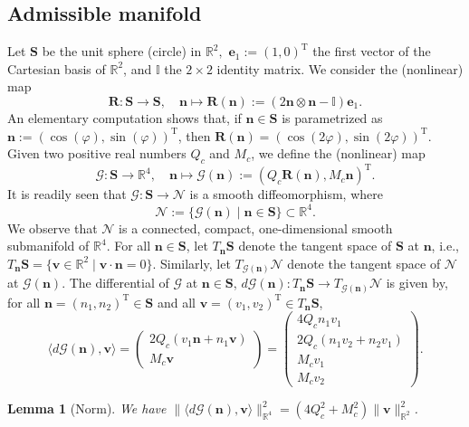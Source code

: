 \documentclass[a4paper,11pt]{article}
\newtheorem{lemma}[theorem]{Lemma}
\theoremstyle{definition}
\theoremstyle{remark}
\numberwithin{equation}{section}
\newcommand{\Real}{\mathbb{R}}
\newcommand{\bbI}{\mathbb{I}}
\newcommand{\be}{{\boldsymbol e}}
\newcommand{\bn}{{\boldsymbol n}}
\newcommand{\bv}{{\boldsymbol v}}
\newcommand{\bR}{{\boldsymbol R}}
\newcommand{\bS}{{\boldsymbol S}}
\newcommand{\calG}{\mathcal{G}}
\newcommand{\calN}{\mathcal{N}}
\newcommand{\tr}{^{\mathrm{T}}}
\newcommand{\SCAL}{{\cdot}}
\begin{document}
\subsection{Admissible manifold}

Let $\bS$ be the unit sphere (circle) in $\Real^2,$  $\be_1:=(1,0)\tr$ the first vector of the Cartesian basis of $\Real^2$, and $\bbI$ the $2\times 2$ identity matrix. We consider the (nonlinear) map
\begin{equation}
\bR : \bS \rightarrow \bS, \quad \bn \mapsto \bR(\bn) := (2\bn\otimes\bn-\bbI)\be_1.
\end{equation}
An elementary computation shows that, if $\bn\in\bS$ is parametrized as $\bn:=(\cos(\varphi),\sin(\varphi))\tr$, then $\bR(\bn)=(\cos(2\varphi),\sin(2\varphi))\tr$. Given two positive real numbers $Q_c$ and $M_c$, we 
define the (nonlinear) map
\begin{equation} \label{eq:calG}
\calG : \bS \rightarrow \Real^4, \quad \bn \mapsto \calG(\bn):= (Q_c\bR(\bn),M_c\bn)\tr.
\end{equation}
It is readily seen that $\calG : \bS \rightarrow \calN$ is a smooth diffeomorphism, where
\begin{equation}\label{equn:manifold}
\calN := \{ \calG(\bn)  \;|\; \bn \in \bS \} \subset \Real^4.
\end{equation}
We observe that $\calN$ is a connected, compact, one-dimensional smooth submanifold of $\Real^4$. For all $\bn\in\bS$, let $T_{\bn}\bS$ denote the tangent space of $\bS$ at $\bn$, i.e., $T_{\bn}\bS=\{\bv\in\Real^2\;|\;\bv\SCAL\bn=0\}$. Similarly, let $T_{\calG(\bn)}\calN$ denote the tangent space of $\calN$ at $\calG(\bn)$. The differential of $\calG$ at $\bn\in\bS$, $d\calG(\bn): T_{\bn}\bS \rightarrow T_{\calG(\bn)}\calN$ is given by, for all $\bn=(n_1,n_2)\tr \in\bS$ and all $\bv=(v_1,v_2)\tr \in T_{\bn}\bS$,
\begin{equation} \label{eq:diff_calG}
\langle d\calG(\bn),\bv \rangle = 
\begin{pmatrix}
2Q_c(v_1 \bn+n_1 \bv) \\ M_c\bv 
\end{pmatrix}
= 
\begin{pmatrix}
4Q_cn_1v_1 \\
2Q_c(n_1v_2+n_2v_1) \\
M_cv_1 \\
M_cv_2
\end{pmatrix}.
\end{equation}

\begin{lemma}[Norm] \label{lem:norm_dG}
We have $\|\langle d\calG(\bn),\bv \rangle\|_{\Real^4}^2=(4Q_c^2+M_c^2)\|\bv\|_{\Real^2}^2$.
\end{lemma}
\end{document}
